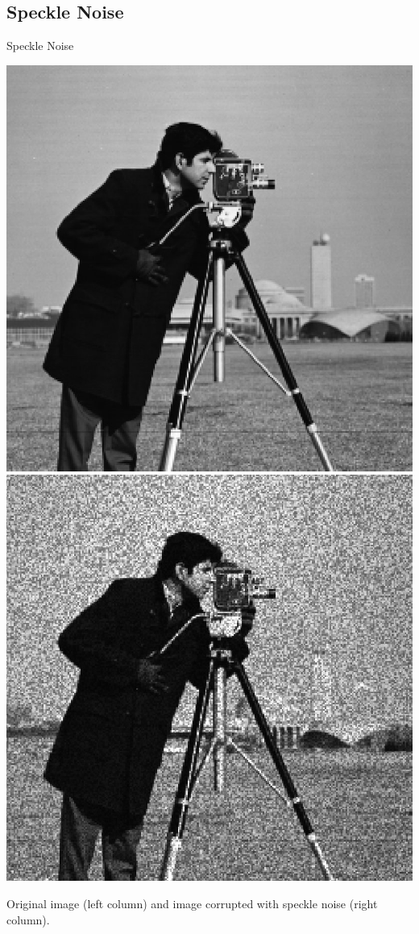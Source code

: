 \documentclass{beamer}
\begin{document}
\subsection{Speckle Noise}
\begin{frame}{Speckle Noise}
\begin{center}
  \includegraphics[width=0.4\columnwidth]{images/salt_pepper_origin.jpg}
    \includegraphics[width=0.4\columnwidth]{images/speckle_noise.jpg}
   
    Original image (left column) and image corrupted with speckle noise (right column).
\end{center}

\end{frame}


		
\end{document}
